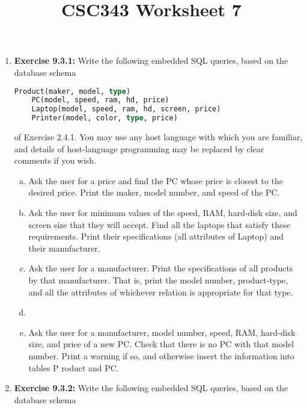 \documentclass[12pt]{article}
\begin{document}
\title{CSC343 Worksheet 7}
\maketitle

\begin{enumerate}[1.]
    \item \textbf{Exercise 9.3.1:} Write the following embedded SQL queries, based on the
    database schema

    \bigskip

    \begin{lstlisting}[language=SQL]
    Product(maker, model, type)
    PC(model, speed, ram, hd, price)
    Laptop(model, speed, ram, hd, screen, price)
    Printer(model, color, type, price)
    \end{lstlisting}

    \bigskip

    of Exercise 2.4.1. You may use any host language with which you are familiar,
    and details of host-language programming may be replaced by clear comments
    if you wish.

    \bigskip

    \begin{enumerate}[a)]
    \item Ask the user for a price and find the PC whose price is closest to the desired price. Print the maker, model number, and speed of the PC.
    \item Ask the user for minimum values of the speed, RAM, hard-disk size, and screen size that they will accept. Find all the laptops that satisfy these requirements. Print their specifications (all attributes of Laptop) and their manufacturer.
    \item Ask the user for a manufacturer. Print the specifications of all products by that manufacturer. That is, print the model number, product-type, and all the attributes of whichever relation is appropriate for that type.
    \item
    \item Ask the user for a manufacturer, model number, speed, RAM, hard-disk size, and price of a new PC. Check that there is no PC with that model number. Print a warning if so, and otherwise insert the information into tables P roduct and PC.
    \end{enumerate}

    \bigskip

    \item \textbf{Exercise 9.3.2:} Write the following embedded SQL queries, based on the
    database schema


\end{enumerate}
\end{document}

